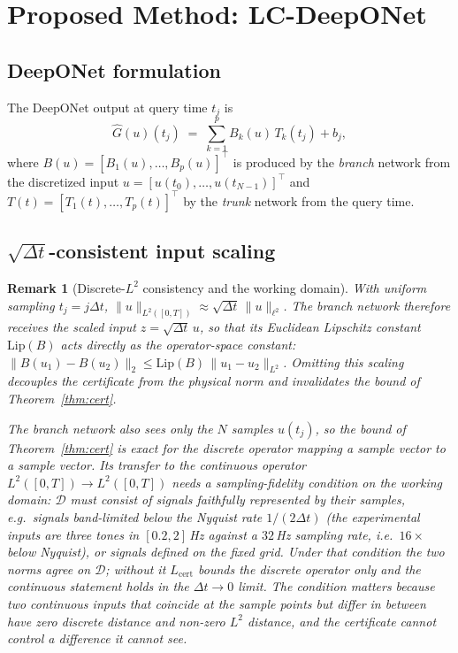 \documentclass[11pt]{article}
\newtheorem{remark}{Remark}
\newcommand{\Ltwo}{L^2}
\newcommand{\Ghat}{\hat{G}}
\newcommand{\Lhat}{L_{\mathrm{cert}}}
\begin{document}
\section{Proposed Method: LC-DeepONet}\label{sec:method}

\subsection{DeepONet formulation}
The DeepONet output at query time $t_j$ is
\begin{equation}
  \Ghat(u)(t_j) \;=\; \sum_{k=1}^{p} B_k(u)\, T_k(t_j) + b_j,
  \label{eq:deeponet}
\end{equation}
where $B(u)=[B_1(u),\dots,B_p(u)]^\top$ is produced by the \emph{branch}
network from the discretized input $u=[u(t_0),\dots,u(t_{N-1})]^\top$ and
$T(t)=[T_1(t),\dots,T_p(t)]^\top$ by the \emph{trunk} network from the query
time.

\subsection{$\sqrt{\Delta t}$-consistent input scaling}
\begin{remark}[Discrete-$\Ltwo$ consistency and the working domain]\label{rem:sqrtdt}
With uniform sampling $t_j=j\Delta t$,
$\|u\|_{\Ltwo([0,T])}\approx\sqrt{\Delta t}\,\|u\|_{\ell^2}$.
The branch network therefore receives the scaled input
$z=\sqrt{\Delta t}\,u$, so that its Euclidean Lipschitz constant
$\mathrm{Lip}(B)$ acts directly as the operator-space constant:
$\|B(u_1)-B(u_2)\|_2\le\mathrm{Lip}(B)\,\|u_1-u_2\|_{\Ltwo}$.
Omitting this scaling decouples the certificate from the physical norm and
invalidates the bound of Theorem~\ref{thm:cert}.

The branch network also sees only the $N$ samples $u(t_j)$, so the bound of
Theorem~\ref{thm:cert} is \emph{exact for the discrete operator} mapping a
sample vector to a sample vector. Its transfer to the continuous operator
$\Ltwo([0,T])\to\Ltwo([0,T])$ needs a sampling-fidelity condition on the
working domain: $\mathcal{D}$ must consist of signals faithfully represented by
their samples, e.g.\ signals band-limited below the Nyquist rate
$1/(2\Delta t)$ (the experimental inputs are three tones in $[0.2,2]$\,Hz
against a $32$\,Hz sampling rate, i.e.\ $16\times$ below Nyquist), or signals
defined on the fixed grid. Under that condition the two norms agree on
$\mathcal{D}$; without it $\Lhat$ bounds the discrete operator only and the
continuous statement holds in the $\Delta t\to0$ limit. The condition matters
because two continuous inputs that coincide at the sample points but differ in
between have zero discrete distance and non-zero $\Ltwo$ distance, and the
certificate cannot control a difference it cannot see.
\end{remark}
\end{document}
